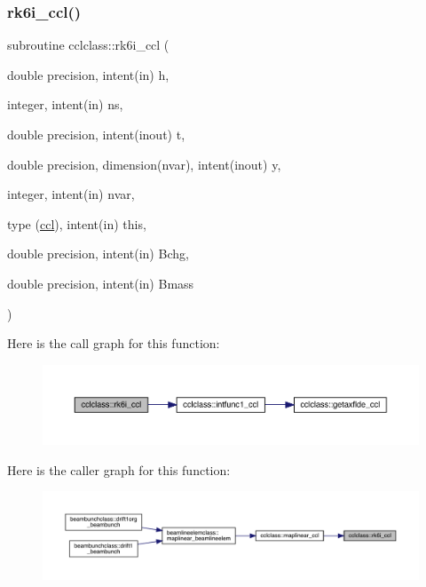 \subsubsection{\texorpdfstring{rk6i\_ccl()}{rk6i\_ccl()}}
{\footnotesize\ttfamily subroutine cclclass\+::rk6i\+\_\+ccl (\begin{DoxyParamCaption}\item[{double precision, intent(in)}]{h,  }\item[{integer, intent(in)}]{ns,  }\item[{double precision, intent(inout)}]{t,  }\item[{double precision, dimension(nvar), intent(inout)}]{y,  }\item[{integer, intent(in)}]{nvar,  }\item[{type (\mbox{\hyperlink{namespacecclclass_structcclclass_1_1ccl}{ccl}}), intent(in)}]{this,  }\item[{double precision, intent(in)}]{Bchg,  }\item[{double precision, intent(in)}]{Bmass }\end{DoxyParamCaption})}

Here is the call graph for this function\+:\nopagebreak
\begin{figure}[H]
\begin{center}
\leavevmode
\includegraphics[width=350pt]{namespacecclclass_a6dd4075592b69b308b61e3ee2f065517_cgraph}
\end{center}
\end{figure}
Here is the caller graph for this function\+:\nopagebreak
\begin{figure}[H]
\begin{center}
\leavevmode
\includegraphics[width=350pt]{namespacecclclass_a6dd4075592b69b308b61e3ee2f065517_icgraph}
\end{center}
\end{figure}
\mbox{\label{namespacecclclass_adf1829da601e1090ce5f5e5046c4d62c}} 
